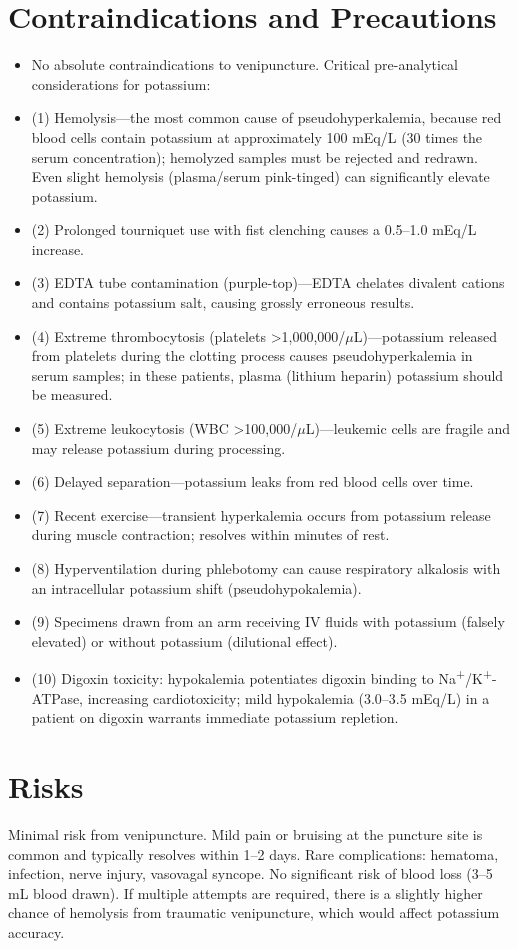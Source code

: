 \section*{Contraindications and Precautions}
\begin{itemize}
  \item No absolute contraindications to venipuncture. Critical pre-analytical considerations for potassium:
  \item (1) Hemolysis---the most common cause of pseudohyperkalemia, because red blood cells contain potassium at approximately 100 mEq/L (30 times the serum concentration); hemolyzed samples must be rejected and redrawn. Even slight hemolysis (plasma/serum pink-tinged) can significantly elevate potassium.
  \item (2) Prolonged tourniquet use with fist clenching causes a 0.5--1.0 mEq/L increase.
  \item (3) EDTA tube contamination (purple-top)---EDTA chelates divalent cations and contains potassium salt, causing grossly erroneous results.
  \item (4) Extreme thrombocytosis (platelets >1,000,000/$\mu$L)---potassium released from platelets during the clotting process causes pseudohyperkalemia in serum samples; in these patients, plasma (lithium heparin) potassium should be measured.
  \item (5) Extreme leukocytosis (WBC >100,000/$\mu$L)---leukemic cells are fragile and may release potassium during processing.
  \item (6) Delayed separation---potassium leaks from red blood cells over time.
  \item (7) Recent exercise---transient hyperkalemia occurs from potassium release during muscle contraction; resolves within minutes of rest.
  \item (8) Hyperventilation during phlebotomy can cause respiratory alkalosis with an intracellular potassium shift (pseudohypokalemia).
  \item (9) Specimens drawn from an arm receiving IV fluids with potassium (falsely elevated) or without potassium (dilutional effect).
  \item (10) Digoxin toxicity: hypokalemia potentiates digoxin binding to Na\textsuperscript{+}/K\textsuperscript{+}-ATPase, increasing cardiotoxicity; mild hypokalemia (3.0--3.5 mEq/L) in a patient on digoxin warrants immediate potassium repletion.
\end{itemize}
\section*{Risks}
Minimal risk from venipuncture. Mild pain or bruising at the puncture site is common and typically resolves within 1--2 days. Rare complications: hematoma, infection, nerve injury, vasovagal syncope. No significant risk of blood loss (3--5 mL blood drawn). If multiple attempts are required, there is a slightly higher chance of hemolysis from traumatic venipuncture, which would affect potassium accuracy.

